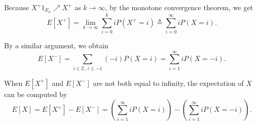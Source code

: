 Because $X^+1_{E_k} \nearrow X^+$ as $k\to\infty$, by the monotone convergence theorem, we get
\[
E[X^+] = \lim_{k\to\infty} \sum_{i=0}^{k} iP(X^+=i)
\triangleq \sum_{i=0}^{\infty} iP(X=i).
\]

By a similar argument, we obtain
\[
E[X^-] = \sum_{i\in\mathbb{Z},\, i\le -1} (-i)P(X=i)
= \sum_{i=1}^{\infty} iP(X=-i).
\]

When $E[X^+]$ and $E[X^-]$ are not both equal to infinity, the expectation of $X$ can be computed by
\[
E[X] = E[X^+] - E[X^-] = \left(\sum_{i=1}^{\infty} iP(X=i)\right) - \left(\sum_{i=1}^{\infty} iP(X=-i)\right).
\]

